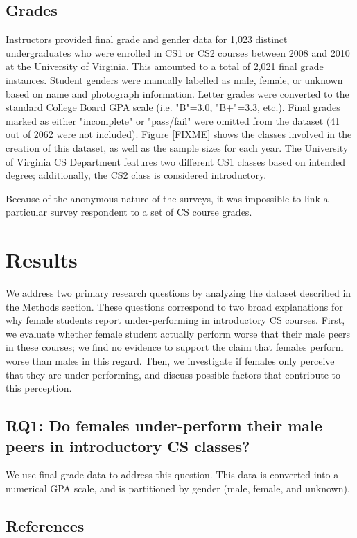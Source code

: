 \documentclass[a4paper,man,natbib]{apa6}
\begin{document}
\subsection{Grades}
\label{sec:grade}
Instructors provided final grade and gender data for 1,023 distinct
undergraduates who were enrolled in CS1 or CS2 courses between 2008 and 2010 at
the University of Virginia. This amounted to a total of 2,021 final grade
instances. Student genders were manually labelled as male, female, or unknown
based on name and photograph information. Letter grades were converted to the
standard College Board GPA scale (i.e. "B"=3.0, "B+"=3.3, etc.). Final grades
marked as either "incomplete" or "pass/fail" were omitted from the dataset (41
out of 2062 were not included). Figure [FIXME] shows the classes involved in
the creation of this dataset, as well as the sample sizes for each year. The
University of Virginia CS Department features two different CS1 classes based
on intended degree; additionally, the CS2 class is considered introductory. 

Because of the anonymous nature of the surveys, it was impossible to link a
particular survey respondent to a set of CS course grades.

\section{Results}
\label{sec:results}
We address two primary research questions by analyzing the dataset described in
the Methods section. These questions correspond to two broad explanations for
why female students report under-performing in introductory CS courses. First,
we evaluate whether female student actually perform worse that their male peers
in these courses; we find no evidence to support the claim that females perform
worse than males in this regard. Then, we investigate if females only perceive
that they are under-performing, and discuss possible factors that contribute to
this perception. 

\subsection{RQ1: Do females under-perform their male peers in introductory CS classes?}
We use final grade data to address this question. This data is converted into a numerical GPA scale, and is partitioned by gender (male, female, and unknown). 



\subsection{References}
\end{document}

